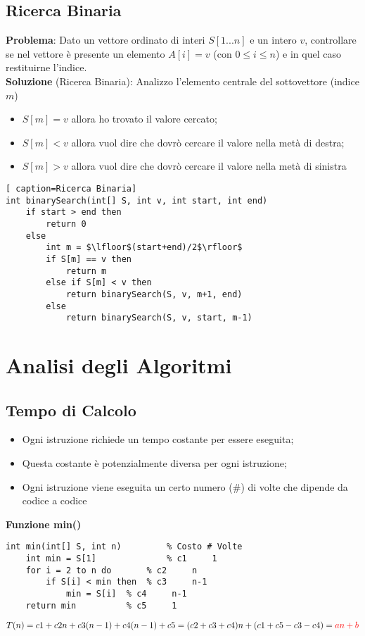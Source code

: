 \documentclass[../cheatSheetAlgoritmi.tex]{subfiles}
\begin{document}
\subsection{Ricerca Binaria}
\textbf{Problema}: Dato un vettore ordinato di interi $S[1...n]$ e un intero $v$, controllare se nel vettore è presente un elemento $A[i] = v$ (con $0 \leq i \leq n$) e in quel caso restituirne l'indice.\\
\textbf{Soluzione} (Ricerca Binaria): Analizzo l'elemento centrale del sottovettore (indice $m$)
\begin{itemize}
	\item $S[m]=v$ allora ho trovato il valore cercato;
	\item $S[m]<v$ allora vuol dire che dovrò cercare il valore nella metà di destra;
	\item $S[m]>v$ allora vuol dire che dovrò cercare il valore nella metà di sinistra
\end{itemize}
\begin{lstlisting}[ caption=Ricerca Binaria]
int binarySearch(int[] S, int v, int start, int end)
	if start > end then
		return 0
	else
		int m = $\lfloor$(start+end)/2$\rfloor$
		if S[m] == v then
			return m
		else if S[m] < v then
			return binarySearch(S, v, m+1, end)
		else
			return binarySearch(S, v, start, m-1)
\end{lstlisting}

\section{Analisi degli Algoritmi}
\subsection{Tempo di Calcolo}
\begin{itemize}
	\item Ogni istruzione richiede un tempo costante per essere eseguita;
	\item Questa costante è potenzialmente diversa per ogni istruzione;
	\item Ogni istruzione viene eseguita un certo numero (\#) di volte che dipende da codice a codice
\end{itemize}
\textbf{Funzione min()}
\begin{lstlisting}[caption=Ricerca Minimo + calcolo del costo]
int min(int[] S, int n)			% Costo # Volte
	int min = S[1]	    		% c1   	 1
	for i = 2 to n do		% c2     n
		if S[i] < min then 	% c3 	 n-1
			min = S[i]	% c4 	 n-1
	return min			% c5	 1
\end{lstlisting}
$T(n) = c1 + c2n + c3(n-1) + c4(n-1) + c5 = (c2 + c3 + c4)n + (c1 + c5 - c3 - c4) = \textcolor{red}{an + b}$
\end{document}

